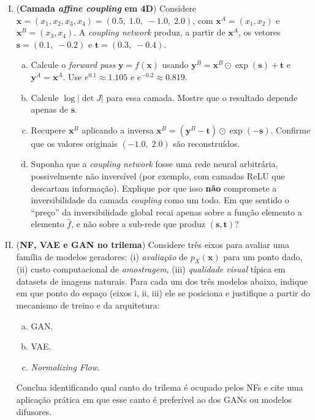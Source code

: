 \documentclass{dlproblemset}
\begin{document}
\begin{enumerate}[I)]
    \item (\textbf{Camada \textit{affine coupling} em 4D}) Considere $\mathbf{x} = (x_1, x_2, x_3, x_4) = (0.5,\; 1.0,\; -1.0,\; 2.0)$, com $\mathbf{x}^A = (x_1, x_2)$ e $\mathbf{x}^B = (x_3, x_4)$. A \textit{coupling network} produz, a partir de $\mathbf{x}^A$, os vetores $\mathbf{s} = (0.1,\; -0.2)$ e $\mathbf{t} = (0.3,\; -0.4)$.
    \begin{enumerate}[(a)]
        \item Calcule o \textit{forward pass} $\mathbf{y} = f(\mathbf{x})$ usando $\mathbf{y}^B = \mathbf{x}^B \odot \exp(\mathbf{s}) + \mathbf{t}$ e $\mathbf{y}^A = \mathbf{x}^A$. Use $e^{0.1} \approx 1.105$ e $e^{-0.2} \approx 0.819$.
        \item Calcule $\log|\det J|$ para essa camada. Mostre que o resultado depende apenas de $\mathbf{s}$.
        \item Recupere $\mathbf{x}^B$ aplicando a inversa $\mathbf{x}^B = (\mathbf{y}^B - \mathbf{t}) \odot \exp(-\mathbf{s})$. Confirme que os valores originais $(-1.0,\; 2.0)$ são reconstruídos.
        \item {} Suponha que a \textit{coupling network} fosse uma rede neural arbitrária, possivelmente não inversível (por exemplo, com camadas ReLU que descartam informação). Explique por que isso \textbf{não} compromete a inversibilidade da camada \textit{coupling} como um todo. Em que sentido o ``preço'' da inversibilidade global recai apenas sobre a função elemento a elemento $\hat{f}$, e não sobre a sub-rede que produz $(\mathbf{s}, \mathbf{t})$?
    \end{enumerate}

    \item (\textbf{NF, VAE e GAN no trilema}) Considere três eixos para avaliar uma família de modelos geradores: (i) \emph{avaliação} de $p_X(\mathbf{x})$ para um ponto dado, (ii) custo computacional de \emph{amostragem}, (iii) \emph{qualidade visual} típica em datasets de imagens naturais. Para cada um dos três modelos abaixo, indique em que ponto do espaço (eixos i, ii, iii) ele se posiciona e justifique a partir do mecanismo de treino e da arquitetura:
    \begin{enumerate}[(a)]
        \item GAN.
        \item VAE.
        \item \textit{Normalizing Flow}.
    \end{enumerate}
    Conclua identificando qual canto do trilema é ocupado pelos NFs e cite uma aplicação prática em que esse canto é preferível ao dos GANs ou modelos difusores.


\end{enumerate}
\end{document}
